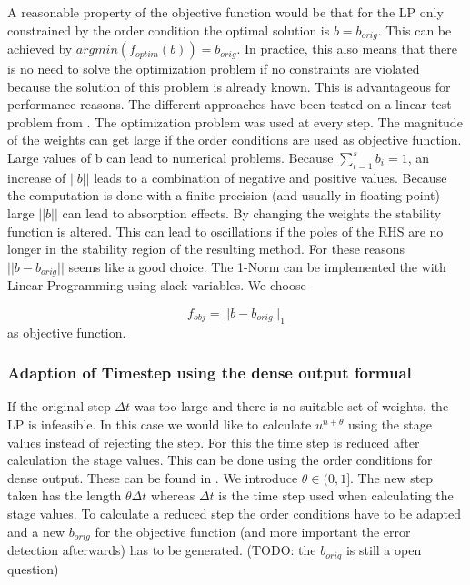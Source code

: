 \documentclass[a4paper]{scrartcl}
\numberwithin{equation}{section}
\theoremstyle{plain}
\theoremstyle{definition}
\numberwithin{theorem}{section}
\newcommand{\dt}{{\Delta t}}
\newcommand{\1}{\mathbbm{1}}
\begin{document}
A reasonable property of the objective function would be that for the LP only constrained by the order condition the optimal solution is $b = b_{orig}$. 
This can be achieved by $argmin(f_{optim}(b)) = b_{orig}$. 
In practice, this also means that there is no need to solve the optimization problem if no constraints are violated because the solution of this problem is already known. This is advantageous for performance reasons.
The different approaches have been tested on a linear test problem from \cite{kopecz_unconditionally_2018}. The optimization problem was used at every step.
The magnitude of the weights can get large if the order conditions are used as objective function.
Large values of b can lead to numerical problems. Because $\sum_{i  = 1}^s b_i = 1$, an increase of $||b||$ leads to a combination of negative and positive values. Because the computation is done with a finite precision (and usually in floating point) large $||b||$ can lead to absorption effects.    
By changing the weights the stability function is altered. This can lead to oscillations if the poles of the RHS are no longer in the stability region of the resulting method.
For these reasons $||b-b_{orig}||$ seems like a good choice. The 1-Norm can be implemented the with Linear Programming using slack variables. We choose 

\begin{equation}
f_{obj} = ||b-b_{orig}||_1
\end{equation}
 as objective function.



\subsubsection{Adaption of Timestep using the dense output formual}

If the original step $\dt$ was too large and there is no suitable set of weights, the LP is infeasible. In this case we would like to calculate $u^{n+\theta}$ using the stage values instead of rejecting the step. For this the time step is reduced after calculation the stage values. This can be done using the order conditions for dense output. These can be found in \cite{hairer_solving_1993}.
We introduce $\theta \in (0,1]$. The new step taken has the length $\theta \dt$ whereas $\dt$ is the time step used when calculating the stage values.
To calculate a reduced step the order conditions have to be adapted and a new $b_{orig}$ for the objective function (and more important the error detection afterwards) has to be generated. 
(TODO: the $b_{orig}$ is still a open question)
\end{document}
